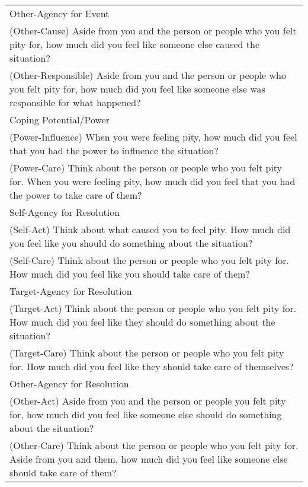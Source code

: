 \documentclass[man]{apa6}
\begin{document}
\begin{table}
\begin{tabular}{p{16cm}}
Other-Agency for Event \\
\hspace{1cm}(Other-Cause) Aside from you and the person or people who you felt pity for, how much did you feel like someone else caused the situation? \\
\hspace{1cm}(Other-Responsible) Aside from you and the person or people who you felt pity for, how much did you feel like someone else was responsible for what happened? \\
Coping Potential/Power \\
\hspace{1cm}(Power-Influence) When you were feeling pity, how much did you feel that you had the power to influence the situation? \\
\hspace{1cm}(Power-Care) Think about the person or people who you felt pity for. When you were feeling pity, how much did you feel that you had the power to take care of them? \\
Self-Agency for Resolution \\
\hspace{1cm}(Self-Act) Think about what caused you to feel pity. How much did you feel like you should do something about the situation? \\
\hspace{1cm}(Self-Care) Think about the person or people who you felt pity for. How much did you feel like you should take care of them? \\
Target-Agency for Resolution \\
\hspace{1cm}(Target-Act) Think about the person or people who you felt pity for. How much did you feel like they should do something about the situation? \\
\hspace{1cm}(Target-Care) Think about the person or people who you felt pity for. How much did you feel like they should take care of themselves? \\
Other-Agency for Resolution \\
\hspace{1cm}(Other-Act) Aside from you and the person or people you felt pity for, how much did you feel like someone else should do something about the situation? \\
\hspace{1cm}(Other-Care) Think about the person or people who you felt pity for. Aside from you and them, how much did you feel like someone else should take care of them? \\

\end{tabular}
\end{table}
\end{document}
